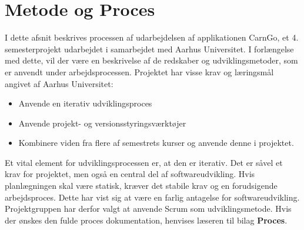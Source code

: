 \documentclass[Rapport/Rapport_main.tex]{subfiles}
\begin{document}
\section{Metode og Proces}
I dette afsnit beskrives processen af udarbejdelsen af applikationen CarnGo, et 4. semesterprojekt udarbejdet i samarbejdet med Aarhus Universitet. I forlængelse med dette, vil der være en beskrivelse af de redskaber og udviklingsmetoder, som er anvendt under arbejdsprocessen. Projektet har visse krav og læringsmål angivet af Aarhus Universitet: 
\begin{itemize}
    \item Anvende en iterativ udviklingsproces
    \item Anvende projekt- og versionsstyringsværktøjer
    \item Kombinere viden fra flere af semestrets kurser og anvende denne i projektet.
\end{itemize}
Et vital element for udviklingsprocessen er, at den er iterativ. Det er såvel et krav for projektet, men også en central del af softwareudvikling. Hvis planlægningen skal være statisk, kræver det stabile krav og en forudsigende arbejdsproces. Dette har vist sig at være en farlig antagelse for softwareudvikling\cite{fowler}. Projektgruppen har derfor valgt at anvende Scrum som udviklingsmetode\cite{Scrum}. 
Hvis der ønskes den fulde proces dokumentation, henvises læseren til bilag \textbf{Proces}. 
\end{document}
